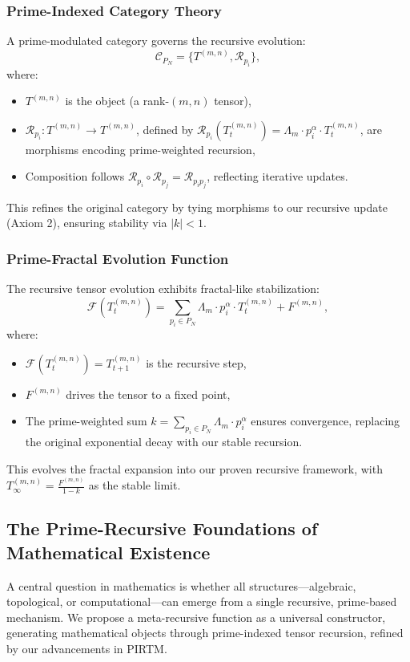 \documentclass[12pt]{article}
\begin{document}
\subsubsection{Prime-Indexed Category Theory}
A prime-modulated category governs the recursive evolution:
\begin{equation}
    \mathcal{C}_{P_N} = \{ T^{(m,n)}, \mathcal{R}_{p_i} \},
\end{equation}
where:
\begin{itemize}
    \item \( T^{(m,n)} \) is the object (a rank-$(m,n)$ tensor),
    \item \( \mathcal{R}_{p_i}: T^{(m,n)} \to T^{(m,n)} \), defined by \( \mathcal{R}_{p_i}(T_t^{(m,n)}) = \Lambda_m \cdot p_i^\alpha \cdot T_t^{(m,n)} \), are morphisms encoding prime-weighted recursion,
    \item Composition follows \( \mathcal{R}_{p_i} \circ \mathcal{R}_{p_j} = \mathcal{R}_{p_i p_j} \), reflecting iterative updates.
\end{itemize}
This refines the original category by tying morphisms to our recursive update (Axiom 2), ensuring stability via \( |k| < 1 \).

\subsubsection{Prime-Fractal Evolution Function}
The recursive tensor evolution exhibits fractal-like stabilization:
\begin{equation}
    \mathcal{F}(T_t^{(m,n)}) = \sum_{p_i \in P_N} \Lambda_m \cdot p_i^\alpha \cdot T_t^{(m,n)} + F^{(m,n)},
\end{equation}
where:
\begin{itemize}
    \item \( \mathcal{F}(T_t^{(m,n)}) = T_{t+1}^{(m,n)} \) is the recursive step,
    \item \( F^{(m,n)} \) drives the tensor to a fixed point,
    \item The prime-weighted sum \( k = \sum_{p_i \in P_N} \Lambda_m \cdot p_i^\alpha \) ensures convergence, replacing the original exponential decay with our stable recursion.
\end{itemize}
This evolves the fractal expansion into our proven recursive framework, with \( T_\infty^{(m,n)} = \frac{F^{(m,n)}}{1 - k} \) as the stable limit.

\subsection{The Prime-Recursive Foundations of Mathematical Existence}
A central question in mathematics is whether all structures—algebraic, topological, or computational—can emerge from a single recursive, prime-based mechanism. We propose a meta-recursive function as a universal constructor, generating mathematical objects through prime-indexed tensor recursion, refined by our advancements in PIRTM.
\end{document}
